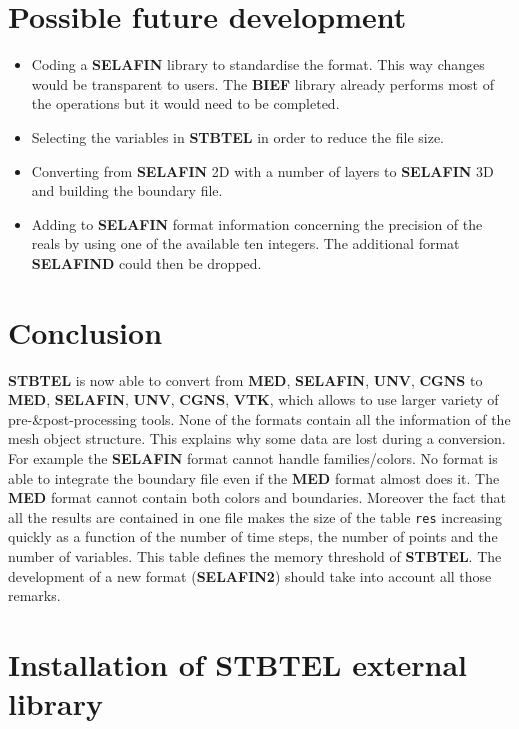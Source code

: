 \documentclass[a4paper,10pt]{article}
\newcommand{\stb}{\textbf{STBTEL}\xspace}
\newcommand{\bief}{\textbf{BIEF}\xspace}
\newcommand{\slf}{\textbf{SELAFIN}\xspace}
\newcommand{\unv}{\textbf{UNV}\xspace}
\newcommand{\med}{\textbf{MED}\xspace}
\newcommand{\vtk}{\textbf{VTK}\xspace}
\newcommand{\cgns}{\textbf{CGNS}\xspace}
\begin{document}
\section{\label{improvment}Possible future development}

\begin{itemize}
\setlength{\itemsep}{1pt}
\setlength{\parskip}{0pt}
\setlength{\parsep}{0pt}
\item Coding a \slf library to standardise the format. This way changes would be transparent to users.
The \bief library already performs most of the operations but it would need to be completed.
\item Selecting the variables in \stb in order to reduce the file size.
\item Converting from \slf 2D with a number of layers to \slf 3D and building the boundary file.
\item Adding to \slf format information concerning the precision of the reals by using one of the available ten integers.
The additional format \textbf{SELAFIND} could then be dropped.
\end{itemize}

\section{Conclusion}
\stb is now able to convert from \med, \slf, \unv, \cgns  to \med, \slf, \unv, \cgns, \vtk, which allows to use larger variety of pre-\&post-processing tools.
None of the formats contain all the information of the mesh object structure. This explains why some data are lost during a conversion.
For example the \slf format cannot handle families/colors. No format is able to integrate
the boundary file even if the \med format almost does it.
The \med format cannot contain both colors and boundaries. 
Moreover the fact that all the results are contained in one file makes the size of the table \verb+res+ increasing 
quickly as a function of the number of time steps, the number of points and the number of variables. This table defines the memory threshold of \stb.
The development of a new format (\textbf{SELAFIN2}) should 
take into account all those remarks. 

\newpage
\appendix
\appendixpage


\section{Installation of \stb external library}
\end{document}
